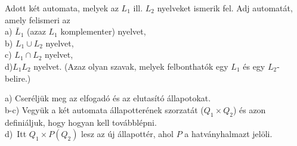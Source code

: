 \begin{Exercise}[counter={sorszam}, difficulty=0]
	Adott két automata, melyek az $L_1$ ill. $L_2$ nyelveket ismerik fel. Adj automatát, amely felismeri az\\
	a) $\bar L_1$ (azaz $L_1$ komplementer) nyelvet,\\
	b) $L_1 \cup L_2$ nyelvet,\\
	c) $L_1 \cap L_2$ nyelvet,\\
	d)\hard $L_1L_2$ nyelvet. (Azaz olyan szavak, melyek felbonthatók egy $L_1$ és egy $L_2$-belire.)
\end{Exercise}
\begin{Answer}
	a) Cser\'elj\"uk meg az elfogad\'o \'es az elutas\'it\'o \'allapotokat.\\
	b-c) Vegy\"uk a k\'et automata \'allapotter\'enek szorzat\'at ($Q_1\times Q_2$) \'es azon defini\'aljuk, hogy hogyan kell tov\'abbl\'epni.\\
	d)~\hard Itt $Q_1\times P(Q_2)$ lesz az \'uj \'allapott\'er, ahol $P$ a hatv\'anyhalmazt jel\"oli.
\end{Answer}



